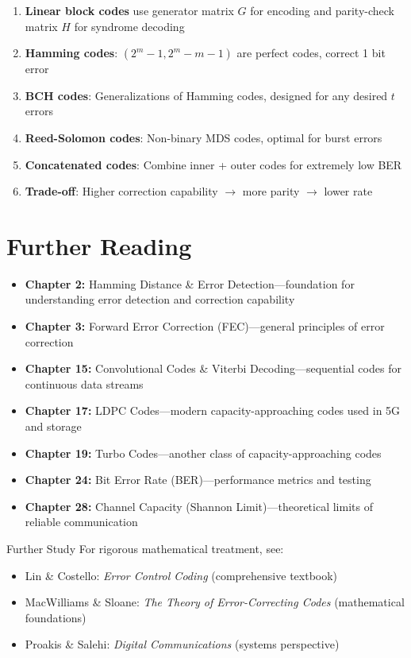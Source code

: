 \begin{enumerate}
\item \textbf{Linear block codes} use generator matrix $G$ for encoding and parity-check matrix $H$ for syndrome decoding
\item \textbf{Hamming codes}: $(2^m-1, 2^m-m-1)$ are perfect codes, correct 1 bit error
\item \textbf{BCH codes}: Generalizations of Hamming codes, designed for any desired $t$ errors
\item \textbf{Reed-Solomon codes}: Non-binary MDS codes, optimal for burst errors
\item \textbf{Concatenated codes}: Combine inner + outer codes for extremely low BER
\item \textbf{Trade-off}: Higher correction capability $\rightarrow$ more parity $\rightarrow$ lower rate
\end{enumerate}

\section{Further Reading}

\begin{itemize}
\item \textbf{Chapter 2:} Hamming Distance \& Error Detection---foundation for understanding error detection and correction capability
\item \textbf{Chapter 3:} Forward Error Correction (FEC)---general principles of error correction
\item \textbf{Chapter 15:} Convolutional Codes \& Viterbi Decoding---sequential codes for continuous data streams
\item \textbf{Chapter 17:} LDPC Codes---modern capacity-approaching codes used in 5G and storage
\item \textbf{Chapter 19:} Turbo Codes---another class of capacity-approaching codes
\item \textbf{Chapter 24:} Bit Error Rate (BER)---performance metrics and testing
\item \textbf{Chapter 28:} Channel Capacity (Shannon Limit)---theoretical limits of reliable communication
\end{itemize}

\begin{calloutbox}{Further Study}
For rigorous mathematical treatment, see:
\begin{itemize}
\item Lin \& Costello: \textit{Error Control Coding} (comprehensive textbook)
\item MacWilliams \& Sloane: \textit{The Theory of Error-Correcting Codes} (mathematical foundations)
\item Proakis \& Salehi: \textit{Digital Communications} (systems perspective)
\end{itemize}
\end{calloutbox}
